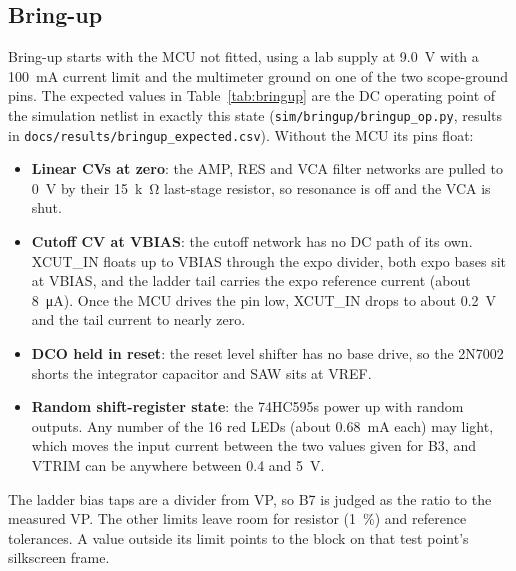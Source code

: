 \documentclass[11pt,a4paper]{article}
\newcommand{\file}[1]{\texttt{#1}}
\begin{document}
\subsection{Bring-up}
Bring-up starts with the MCU not fitted, using a lab supply at \SI{9.0}{V} with a \SI{100}{mA} current limit
and the multimeter ground on one of the two scope-ground pins. The expected values in
Table~\ref{tab:bringup} are the DC operating point of the simulation netlist in exactly this state
(\file{sim/bringup/bringup\_op.py}, results in \file{docs/results/bringup\_expected.csv}). Without the MCU
its pins float:
\begin{itemize}
  \item \textbf{Linear CVs at zero}: the AMP, RES and VCA filter networks are pulled to \SI{0}{V} by their
    \SI{15}{k\ohm} last-stage resistor, so resonance is off and the VCA is shut.
  \item \textbf{Cutoff CV at VBIAS}: the cutoff network has no DC path of its own. XCUT\_IN floats up to
    VBIAS through the expo divider, both expo bases sit at VBIAS, and the ladder tail carries the expo
    reference current (about \SI{8}{\micro A}). Once the MCU drives the pin low, XCUT\_IN drops to about
    \SI{0.2}{V} and the tail current to nearly zero.
  \item \textbf{DCO held in reset}: the reset level shifter has no base drive, so the 2N7002 shorts the
    integrator capacitor and SAW sits at VREF.
  \item \textbf{Random shift-register state}: the 74HC595s power up with random outputs. Any number of the
    16 red LEDs (about \SI{0.68}{mA} each) may light, which moves the input current between the two values
    given for B3, and VTRIM can be anywhere between 0.4 and \SI{5}{V}.
\end{itemize}
The ladder bias taps are a divider from VP, so B7 is judged as the ratio to the measured VP. The other limits
leave room for resistor (\SI{1}{\percent}) and reference tolerances. A value outside its limit points to the
block on that test point's silkscreen frame.
\end{document}
